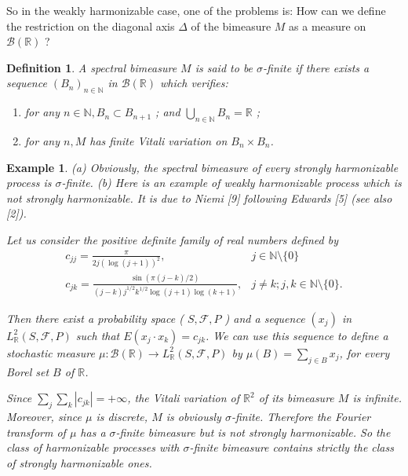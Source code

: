 \documentclass{article}
\begin{document}
So in the weakly harmonizable case, one of the problems is: How can we define the restriction on the diagonal axis \(\Delta\) of the bimeasure \(M\) as a measure on \(\mathscr{B}(\mathbb{R})\) ?
\newtheorem{definition}{Definition}[section] %
\begin{definition} %
A spectral bimeasure \(M\) is said to be \(\sigma\)-finite if there exists a sequence \(\left(B_{n}\right)_{n \in \mathbb{N}}\) in \(\mathscr{B}(\mathbb{R})\) which verifies:
\begin{enumerate}
    \item[(1)] for any \(n \in \mathbb{N}, B_{n} \subset B_{n+1}\) ; and \(\bigcup_{n \in \mathbb{N}} B_{n}=\mathbb{R}\) ;
    \item[(2)] for any \(n, M\) has finite Vitali variation on \(B_{n} \times B_{n}\).
\end{enumerate}
\end{definition}

\newtheorem{example}{Example}[section] %
\begin{example} %
(a) Obviously, the spectral bimeasure of every strongly harmonizable process is \(\sigma\)-finite.
(b) Here is an example of weakly harmonizable process which is not strongly harmonizable. It is due to Niemi [9] following Edwards [5] (see also [2]).

Let us consider the positive definite family of real numbers defined by
\[
\begin{array}{ll}
c_{j j}=\frac{\pi}{2 j(\log (j+1))^{2}}, & j \in \mathbb{N} \setminus \{0\} \\
c_{j k}=\frac{\sin (\pi(j-k) / 2)}{(j-k) j^{1 / 2} k^{1 / 2} \log (j+1) \log (k+1)}, & j \neq k ; j, k \in \mathbb{N} \setminus \{0\} .
\end{array}
\]

Then there exist a probability space ( \(S, \mathscr{F}, P\) ) and a sequence \(\left(x_{j}\right)\) in \(L_{\mathbb{R}}^{2}(S, \mathscr{F}, P)\) such that \(E\left(x_{j} \cdot x_{k}\right)=c_{j k}\). We can use this sequence to define a stochastic measure \(\mu: \mathscr{B}(\mathbb{R}) \rightarrow L_{\mathbb{R}}^{2}(S, \mathscr{F}, P)\) by \(\mu(B)=\sum_{j \in B} x_{j}\), for every Borel set \(B\) of \(\mathbb{R}\).

Since \(\sum_{j} \sum_{k}\left|c_{j k}\right|=+\infty\), the Vitali variation of \(\mathbb{R}^{2}\) of its bimeasure \(M\) is infinite. Moreover, since \(\mu\) is discrete, \(M\) is obviously \(\sigma\)-finite. Therefore the Fourier transform of \(\mu\) has a \(\sigma\)-finite bimeasure but is not strongly harmonizable. So the class of harmonizable processes with \(\sigma\)-finite bimeasure contains strictly the class of strongly harmonizable ones.
\end{example}
\end{document}
